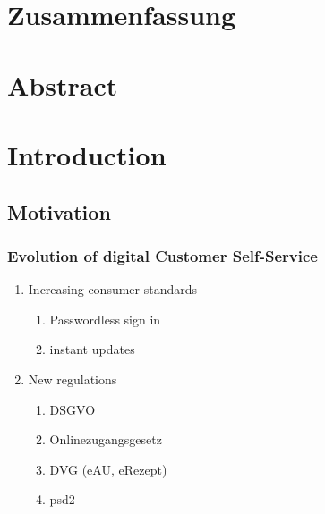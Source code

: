 \documentclass[
     12pt,         %
     a4paper,      %
     BCOR10mm,     %
     DIV14,        %
     ]{scrreprt}
\begin{document}
\chapter*{Zusammenfassung}

\newpage

\chapter*{Abstract}

\newpage

\tableofcontents
\cleardoublepage
{}



\chapter{Introduction}\label{intro}

\section{Motivation}

\subsection{Evolution of digital Customer Self-Service}
\begin{enumerate}
     \item Increasing consumer standards
           \begin{enumerate}
                \item Passwordless sign in
                \item instant updates
           \end{enumerate}

     \item New regulations
           \begin{enumerate}
                \item DSGVO
                \item Onlinezugangsgesetz
                \item DVG (eAU, eRezept)
                \item psd2
           \end{enumerate}

\end{enumerate}
\end{document}
